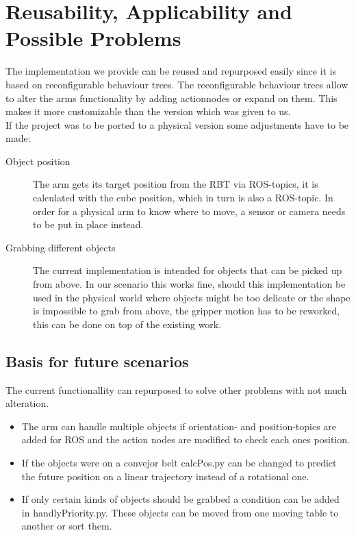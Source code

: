 \documentclass[report]{iisthesis}
\begin{document}
\setcounter{chapter}{3}
\setcounter{section}{0}
\chapter{Reusability, Applicability and Possible Problems}
The implementation we provide can be reused and repurposed easily since it is based on reconfigurable behaviour trees. The reconfigurable behaviour trees allow to alter the arms functionality
by adding actionnodes or expand on them. This makes it more customizable than the version which was given to us. \\
If the project was to be ported to a physical version some adjustments have to be made:
\begin{description}
    \item[Object position] The arm gets its target position from the RBT via ROS-topics, it is calculated with the cube position, which in turn is also a ROS-topic. In order for a physical arm to know where to move, a sensor or camera needs to be put in place instead. 
    \item[Grabbing different objects] The current implementation is intended for objects that can be picked up from above. In our scenario this works fine, should this implementation be used in the physical world where objects might be too delicate or the shape is impossible
    to grab from above, the gripper motion has to be reworked, this can be done on top of the existing work.
\end{description} 
\noindent
\section{Basis for future scenarios}
The current functionallity can repurposed to solve other problems with not much alteration.
\begin{itemize}
    \item The arm can handle multiple objects if orientation- and position-topics are added for ROS and the action nodes are modified to check each ones position. 
    \item If the objects were on a convejor belt calcPos.py can be changed to predict the future position on a linear trajectory instead of a rotational one.
    \item If only certain kinds of objects should be grabbed a condition can be added in handlyPriority.py. These objects can be moved from one moving table to another or sort them.
\end{itemize}



\end{document}
